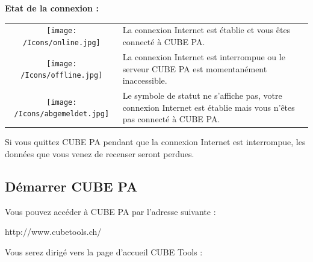 \vspace{\baselineskip}

\textbf{Etat de la connexion :}

\vspace{\baselineskip}

\begin{tabular}{c | p{14cm} l} %

\vspace{+1pt}	
\texttt{[image: /Icons/online.jpg]} & La connexion Internet est établie et vous êtes connecté à CUBE PA. \\
\vspace{+1pt}	
\texttt{[image: /Icons/offline.jpg]} & La connexion Internet est interrompue ou le serveur CUBE PA est momentanément inaccessible. \\
\vspace{+1pt}	
\texttt{[image: /Icons/abgemeldet.jpg]} & Le symbole de statut ne s'affiche pas, votre connexion Internet est établie mais vous n'êtes pas connecté à CUBE PA. \\


\end{tabular}

\vspace{\baselineskip}

Si vous quittez CUBE PA pendant que la connexion Internet est interrompue, les données que vous venez de recenser seront perdues.

\subsection{Démarrer CUBE PA}


Vous pouvez accéder à CUBE PA par l'adresse suivante :

\vspace{\baselineskip}

{\color{red} http://www.cubetools.ch/}

\vspace{\baselineskip}

Vous serez dirigé vers la page d'accueil CUBE Tools :

